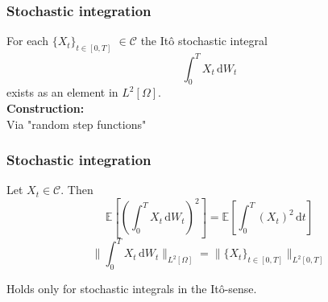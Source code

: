 %

%
%



\begin{frame}
\frametitle{Stochastic integration}
For each \(\{X_t\}_{t\in[0,T]}\) \(\in\mathcal{C}\) the It\^o stochastic integral 
\[\int_0^T\! X_t\,\mathrm{d}W_{t}\]
exists as an element in \(L^2[\Omega]\).\\

\textbf{Construction:}\\
Via "random step functions"


\end{frame}


\begin{frame}
\frametitle{Stochastic integration}
\begin{theorem}[It\^o isometry]
Let \(X_t\!\in\mathcal{C}\). Then
\[\mathbb{E}[(\int_0^T\!X_t\,\mathrm{d}W_{t})^2] = \mathbb{E}[\int_0^T\!(X_t)^2\,\mathrm{d}t]\]
\[\|\int_0^T\!X_t\,\mathrm{d}W_{t}\|_{L^2[\Omega]} = \|\{X_t\}_{t\in[0,T]}\|_{L^2[0,T]}\]
\end{theorem}
Holds only for stochastic integrals in the It\^o-sense.
\end{frame}




